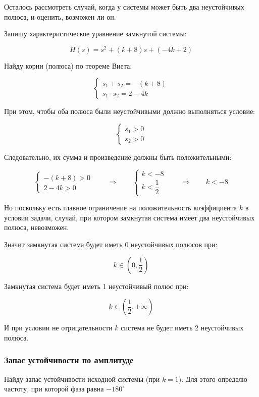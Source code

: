 \documentclass[a4paper,12pt]{article}
\begin{document}
	Осталось рассмотреть случай, когда у системы может быть два неустойчивых полюса, и оценить, возможен ли он.
	
	Запишу характеристическое уравнение замкнутой системы:
	
	\[H(s) = s^2 + (k + 8)s + (-4k +2)\]
	
	Найду корни (полюса) по теореме Виета:
	
	\[
	\begin{cases}
		s_1 + s_2 = -(k+8) \\
		s_1 \cdot s_2 = 2-4k
	\end{cases}
	\]
	
	При этом, чтобы оба полюса были неустойчивыми должно выполняться условие: 
	
		\[
	\begin{cases}
		s_1 > 0 \\
		s_2 > 0
	\end{cases}
	\]
	
	Следовательно, их сумма и произведение должны быть положительными:
	
	\[
	\begin{cases}
		-(k+8) > 0\\
		2-4k > 0
	\end{cases}
	\qquad \Longrightarrow \qquad 
	\begin{cases}
		k < -8\\
		k < \dfrac{1}{2}
	\end{cases}
	\qquad \Longrightarrow \qquad 
	k < -8
	\]
	
	Но поскольку есть главное ограничение на положительность коэффициента \(k\) в условии задачи, случай, при котором замкнутая система имеет два неустойчивых полюса, невозможен.
	
	Значит замкнутая система будет иметь 0 неустойчивых полюсов при:
	
	\[
	k \in (0, \dfrac{1}{2})
	\]
	
	Замкнутая система будет иметь 1 неустойчивый полюс при:
	
	\[ k \in (\dfrac{1}{2}, +\infty)  \]

	И при условии не отрицательности \(k\) система не будет иметь 2 неустойчивых полюса.
	
	
	\subsubsection{Запас устойчивости по амплитуде}
	
	Найду запас устойчивости исходной системы (при \(k = 1\)). Для этого
	определю частоту, при которой фаза равна \(-180^\circ\)
	
\end{document}
